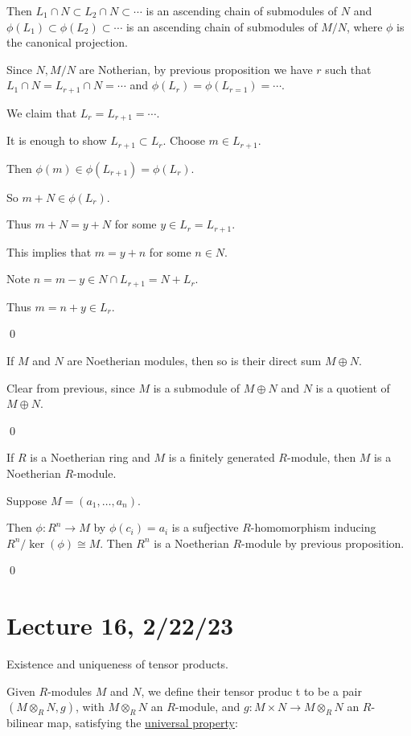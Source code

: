 \documentclass[x11names,reqno,14pt]{extarticle}
\begin{document}
Then $L_1 \cap N \subset L_2 \cap N \subset \cdots$ is an ascending chain of submodules of $N$ and $\phi(L_1) \subset \phi(L_2) \subset \cdots$ is an ascending chain of submodules of $M/N$, where $\phi$ is the canonical projection. 

Since $N, M/N$ are Notherian, by previous proposition we have $r$ such that $L_1 \cap N = L_{r + 1} \cap N = \cdots$ and $\phi(L_r) = \phi(L_{r = 1}) = \cdots$. 

We claim that $L_r = L_{r + 1} = \cdots$. 

It is enough to show $L_{r + 1} \subset L_r$. Choose $m\in L_{r + 1}$. 

Then $\phi(m) \in \phi(L_{r + 1}) = \phi(L_r)$. 

So $m + N \in \phi(L_r)$. 

Thus $m + N = y + N$ for some $y \in L_r = L_{r + 1}$. 

This implies that $m = y + n$ for some $n \in N$. 

Note $n = m - y \in N \cap L_{r + 1} = N + L_r$. 

Thus $m = n + y \in L_r$. 

\qed

\cor 

If $M$ and $N$ are Noetherian modules, then so is their direct sum $M \oplus N$. 

\proof

Clear from previous, since $M$ is a submodule of $M \oplus N$ and $N$ is a quotient of $M \oplus N$. 

\qed

\prop

If $R$ is a Noetherian ring and $M$ is a finitely generated $R$-module, then $M$ is a Noetherian $R$-module. 

\proof

Suppose $M = (a_1, \dots, a_n)$. 

Then $\phi:R^n\to M$ by $\phi(c_i) = a_i$ is a sufjective $R$-homomorphism inducing $R^n/\ker(\phi) \cong M$. Then $R^n$ is a Noetherian $R$-module by previous proposition. 

\qed

\section*{Lecture 16, 2/22/23}

Existence and uniqueness of tensor products. 

Given $R$-modules $M$ and $N$, we define their tensor produc t to be a pair $(M\otimes_RN, g)$, with $M\otimes_RN$ an $R$-module, and $g:M\times N\to M\otimes_RN$ an $R$-bilinear map, satisfying the \underline{universal property}:
\end{document}
